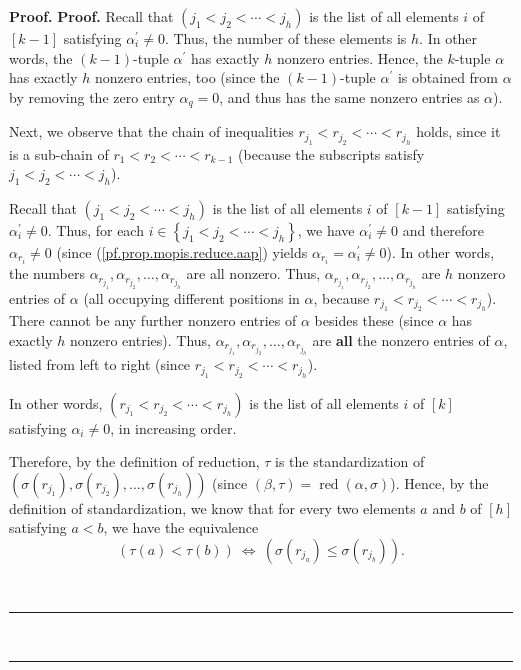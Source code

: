 \documentclass[numbers=enddot,12pt,final,onecolumn,notitlepage]{scrartcl}%
\theoremstyle{definition}
\newenvironment{fineprint}{\begin{small}}{\end{small}}
\newenvironment{proof}[1][Proof]{\noindent\textbf{#1.} }{\ \rule{0.5em}{0.5em}}
\begin{document}
\begin{fineprint}
\begin{proof}
\begin{proof}
Recall that $\left(  j_{1}<j_{2}<\cdots<j_{h}\right)  $ is the list of all
elements $i$ of $\left[  k-1\right]  $ satisfying $\alpha_{i}^{\prime}\neq0$.
Thus, the number of these elements is $h$. In other words, the $\left(
k-1\right)  $-tuple $\alpha^{\prime}$ has exactly $h$ nonzero entries. Hence,
the $k$-tuple $\alpha$ has exactly $h$ nonzero entries, too (since the
$\left(  k-1\right)  $-tuple $\alpha^{\prime}$ is obtained from $\alpha$ by
removing the zero entry $\alpha_{q}=0$, and thus has the same nonzero entries
as $\alpha$).

Next, we observe that the chain of inequalities $r_{j_{1}}<r_{j_{2}}%
<\cdots<r_{j_{h}}$ holds, since it is a sub-chain of $r_{1}<r_{2}%
<\cdots<r_{k-1}$ (because the subscripts satisfy $j_{1}<j_{2}<\cdots<j_{h}$).

Recall that $\left(  j_{1}<j_{2}<\cdots<j_{h}\right)  $ is the list of all
elements $i$ of $\left[  k-1\right]  $ satisfying $\alpha_{i}^{\prime}\neq0$.
Thus, for each $i\in\left\{  j_{1}<j_{2}<\cdots<j_{h}\right\}  $, we have
$\alpha_{i}^{\prime}\neq0$ and therefore $\alpha_{r_{i}}\neq0$ (since
(\ref{pf.prop.mopis.reduce.aap}) yields $\alpha_{r_{i}}=\alpha_{i}^{\prime
}\neq0$). In other words, the numbers $\alpha_{r_{j_{1}}},\alpha_{r_{j_{2}}%
},\ldots,\alpha_{r_{j_{h}}}$ are all nonzero. Thus, $\alpha_{r_{j_{1}}}%
,\alpha_{r_{j_{2}}},\ldots,\alpha_{r_{j_{h}}}$ are $h$ nonzero entries of
$\alpha$ (all occupying different positions in $\alpha$, because $r_{j_{1}%
}<r_{j_{2}}<\cdots<r_{j_{h}}$). There cannot be any further nonzero entries of
$\alpha$ besides these (since $\alpha$ has exactly $h$ nonzero entries). Thus,
$\alpha_{r_{j_{1}}},\alpha_{r_{j_{2}}},\ldots,\alpha_{r_{j_{h}}}$ are
\textbf{all} the nonzero entries of $\alpha$, listed from left to right (since
$r_{j_{1}}<r_{j_{2}}<\cdots<r_{j_{h}}$).

In other words, $\left(  r_{j_{1}}<r_{j_{2}}<\cdots<r_{j_{h}}\right)  $ is the
list of all elements $i$ of $\left[  k\right]  $ satisfying $\alpha_{i}\neq0$,
in increasing order.

Therefore, by the definition of reduction, $\tau$ is the standardization of
$\left(  \sigma\left(  r_{j_{1}}\right)  ,\sigma\left(  r_{j_{2}}\right)
,\ldots,\sigma\left(  r_{j_{h}}\right)  \right)  $ (since $\left(  \beta
,\tau\right)  =\operatorname*{red}\left(  \alpha,\sigma\right)  $). Hence, by
the definition of standardization, we know that for every two elements $a$ and
$b$ of $\left[  h\right]  $ satisfying $a<b$, we have the equivalence%
\begin{equation}
\left(  \tau\left(  a\right)  <\tau\left(  b\right)  \right)
\ \Longleftrightarrow\ \left(  \sigma\left(  r_{j_{a}}\right)  \leq
\sigma\left(  r_{j_{b}}\right)  \right)  . \label{pf.prop.mopis.reduce.equiv2}%
\end{equation}



\end{proof}
\end{proof}
\end{fineprint}
\end{document}
